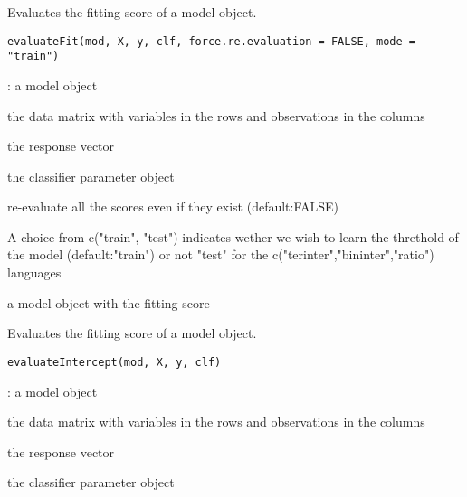 \documentclass[a4paper]{book}
\begin{document}
%
\begin{Description}
Evaluates the fitting score of a model object.
\end{Description}
%
\begin{Usage}
\begin{verbatim}
evaluateFit(mod, X, y, clf, force.re.evaluation = FALSE, mode = "train")
\end{verbatim}
\end{Usage}
%
\begin{Arguments}
\begin{ldescription}
\item[\code{mod}] : a model object

\item[\code{X:}] the data matrix with variables in the rows and observations in the columns

\item[\code{y:}] the response vector

\item[\code{clf:}] the classifier parameter object

\item[\code{force.re.evaluation:}] re-evaluate all the scores even if they exist (default:FALSE)

\item[\code{mode:}] A choice from c("train", "test") indicates wether we wish to learn the threthold 
of the model (default:"train") or not "test" for the c("terinter","bininter","ratio") languages
\end{ldescription}
\end{Arguments}
%
\begin{Value}
a model object with the fitting score
\end{Value}
%
\begin{Description}
Evaluates the fitting score of a model object.
\end{Description}
%
\begin{Usage}
\begin{verbatim}
evaluateIntercept(mod, X, y, clf)
\end{verbatim}
\end{Usage}
%
\begin{Arguments}
\begin{ldescription}
\item[\code{mod}] : a model object

\item[\code{X:}] the data matrix with variables in the rows and observations in the columns

\item[\code{y:}] the response vector

\item[\code{clf:}] the classifier parameter object
\end{ldescription}
\end{Arguments}
\end{document}

